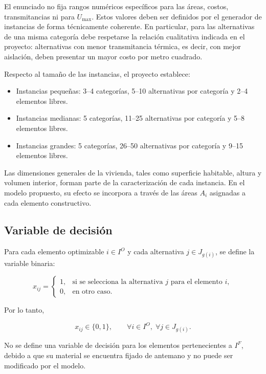 \documentclass[journal, 12pt, onecolumn]{IEEEtran}
\begin{document}
El enunciado no fija rangos numéricos específicos para las áreas, costos,
transmitancias ni para $U_{\max}$. Estos valores deben ser definidos por el
generador de instancias de forma técnicamente coherente. En particular, para
las alternativas de una misma categoría debe respetarse la relación
cualitativa indicada en el proyecto: alternativas con menor transmitancia
térmica, es decir, con mejor aislación, deben presentar un mayor costo por
metro cuadrado.

Respecto al tamaño de las instancias, el proyecto establece:

\begin{itemize}
    \item Instancias pequeñas: 3--4 categorías, 5--10 alternativas por
    categoría y 2--4 elementos libres.
    \item Instancias medianas: 5 categorías, 11--25 alternativas por
    categoría y 5--8 elementos libres.
    \item Instancias grandes: 5 categorías, 26--50 alternativas por
    categoría y 9--15 elementos libres.
\end{itemize}

Las dimensiones generales de la vivienda, tales como superficie habitable,
altura y volumen interior, forman parte de la caracterización de cada
instancia. En el modelo propuesto, su efecto se incorpora a través de las
áreas $A_i$ asignadas a cada elemento constructivo.

\subsection{Variable de decisión}

Para cada elemento optimizable $i \in I^{O}$ y cada alternativa
$j \in J_{g(i)}$, se define la variable binaria:

\[
x_{ij}=
\begin{cases}
1, & \text{si se selecciona la alternativa } j \text{ para el elemento } i,\\
0, & \text{en otro caso.}
\end{cases}
\]

Por lo tanto,

\[
x_{ij}\in\{0,1\},
\qquad
\forall i\in I^{O},\;
\forall j\in J_{g(i)}.
\]

No se define una variable de decisión para los elementos pertenecientes a
$I^{F}$, debido a que su material se encuentra fijado de antemano y no puede
ser modificado por el modelo.
\end{document}
